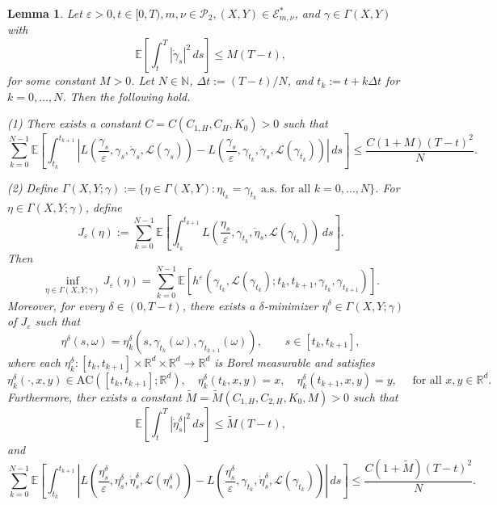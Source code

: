 \documentclass[10pt,a4paper]{amsart}
\newtheorem{lemma}{Lemma}
\newcommand{\e}{\varepsilon}
\newcommand{\ep}{\varepsilon}
\newcommand{\nd}{\noindent}
\begin{document}
\begin{lemma} \label{lem:fixest}
    Let $\e >0, t \in[0, T) ,m, \nu \in \mathcal{P}_2, (X,Y) \in \mathcal{E}^\ast_{m,\nu}$, and $\gamma \in \Gamma(X,Y)$ with
    \[
    \mathbb{E}\left[\int_{t}^T|\dot{\gamma}_s|^2 \,ds\right] \leq M(T-t),
    \]
    for some constant $M>0$. Let $N \in \mathbb{N}$, $\Delta t := (T-t)/N$, and $t_k := t + k\Delta t$ for $k=0,\dots,N$. Then the following hold.

    \nd
    (1) There exists a constant $C=C(C_{1,H}, C_H, K_0)>0$ such that
    \[
\sum_{k=0}^{N-1}\mathbb{E}\left[\int_{t_k}^{t_{k+1}} \left|L\left( \frac{\gamma_s}{\e}, \gamma_s, \dot{\gamma}_s, \mathcal{L}(\gamma_s) \right)-
L\left(\frac{\gamma_s}{\ep}, \gamma_{t_k}, \dot{\gamma}_s, \mathcal{L}(\gamma_{t_k})\right)\right|\,ds\right] \leq \frac{C(1+M)(T-t)^2}{N}.
    \]

\nd
(2) Define $\Gamma(X,Y;\gamma)
:=
\{\eta\in \Gamma(X,Y) : \eta_{t_k}=\gamma_{t_k}\,\, \text{a.s. for all } k=0,\dots,N\}$.  For $\eta \in \Gamma(X,Y;\gamma)$, define
\[
J_\e(\eta)
:=
\sum_{k=0}^{N-1}
\mathbb E\left[
\int_{t_k}^{t_{k+1}}
L\left(\frac{\eta_s}{\varepsilon},\gamma_{t_k},\dot{\eta}_s,\mathcal{L}(\gamma_{t_k})\right)\,ds\right].
\]
Then
\[
\inf_{\eta\in\Gamma(X,Y;\gamma)} J_\varepsilon(\eta)
=
\sum_{k=0}^{N-1}
\mathbb E \left[
h^\e\left(\gamma_{t_k},\mathcal{L}(\gamma_{t_k});t_k,t_{k+1},
\gamma_{t_k},\gamma_{t_{k+1}}\right)\right].
\]
Moreover, for every $\delta\in(0,T-t)$, there exists a $\delta$-minimizer
$\eta^\delta\in\Gamma(X,Y;\gamma)$ of $J_\varepsilon$ such that
\[
\eta^\delta(s, \omega)
=
\eta^\delta_k\left(s,\gamma_{t_k}(\omega),\gamma_{t_{k+1}}(\omega)\right),
\qquad s\in[t_k,t_{k+1}],
\]
where each $\eta^\delta_k:[t_k,t_{k+1}]\times\mathbb R^d\times\mathbb R^d\to\mathbb R^d$ is Borel measurable and satisfies
\[
\eta^\delta_k(\cdot,x,y)\in \mathrm{AC}([t_k,t_{k+1}];\mathbb R^d),
\quad
\eta^\delta_k(t_k,x,y)=x,\quad
\eta^\delta_k(t_{k+1},x,y)=y,\quad \text{ for all }x, y\in \mathbb{R}^d.
\]
Furthermore, ther exists a constant $\tilde{M}=\tilde{M}(C_{1,H},C_{2,H},K_0,M)>0$ such that
\[
\mathbb E\left[
\int_t^T
\left|\dot{\eta}^\delta_s\right|^2 \,ds\right]
\le \tilde{M} (T-t),
\]
and
\begin{equation}\label{eq:freeze-est-eta}
\sum_{k=0}^{N-1}\mathbb{E}\left[\int_{t_k}^{t_{k+1}} \left|L\left( \frac{\eta^\delta_s}{\e}, \eta^\delta_s, \dot{\eta}^\delta_s, \mathcal{L}(\eta^\delta_s) \right)-
L\left(\frac{\eta^\delta_s}{\ep}, \gamma_{t_k}, \dot{\eta}^\delta_s, \mathcal{L}(\gamma_{t_k})\right)\right|\,ds\right] \leq \frac{C(1+\tilde{M})(T-t)^2}{N}.
\end{equation}
\end{lemma}
\end{document}
